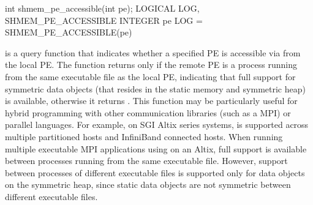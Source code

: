 \synC     
int shmem_pe_accessible(int pe); %
\synF
LOGICAL LOG, SHMEM_PE_ACCESSIBLE
INTEGER pe
LOG = SHMEM_PE_ACCESSIBLE(pe) %

{
        is  a  query function  that indicates  whether  a
       specified \ac{PE} is accessible via \openshmem from the local \ac{PE}. The  function returns  only if  the  remote  \ac{PE} is a process  running from the same executable  file as the local \ac{PE}, indicating that full \openshmem support for symmetric data objects (that resides in the static memory and symmetric heap) is available, otherwise it returns .  This function may be particularly useful for hybrid programming with other communication libraries (such as a \ac{MPI}) or parallel languages.  For example, on  SGI Altix  series  systems, \openshmem is  supported  across multiple partitioned hosts and InfiniBand connected hosts. When running multiple executable MPI applications using \openshmem on an Altix, full \openshmem support is available between processes running from the same executable file. However, \openshmem support between processes of different executable  files  is  supported only for data objects on the symmetric heap, since static data objects are  not symmetric  between  different executable  files.        
}
{
}

\eAPI
